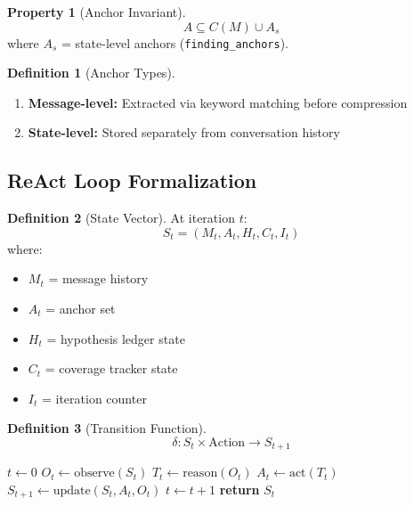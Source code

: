 \documentclass[11pt,a4paper]{article}
\theoremstyle{definition}
\newtheorem{definition}{Definition}[section]
\newtheorem{property}{Property}[section]
\newcommand{\code}[1]{\texttt{#1}}
\begin{document}
\begin{property}[Anchor Invariant]
\begin{equation}
A \subseteq C(M) \cup A_s
\end{equation}
where $A_s$ = state-level anchors (\code{finding\_anchors}).
\end{property}

\begin{definition}[Anchor Types]
\begin{enumerate}[label=(\alph*)]
    \item \textbf{Message-level:} Extracted via keyword matching before compression
    \item \textbf{State-level:} Stored separately from conversation history
\end{enumerate}
\end{definition}

\subsection{ReAct Loop Formalization}

\begin{definition}[State Vector]
At iteration $t$:
\begin{equation}
S_t = (M_t, A_t, H_t, C_t, I_t)
\end{equation}
where:
\begin{itemize}[leftmargin=*]
    \item $M_t$ = message history
    \item $A_t$ = anchor set
    \item $H_t$ = hypothesis ledger state
    \item $C_t$ = coverage tracker state
    \item $I_t$ = iteration counter
\end{itemize}
\end{definition}

\begin{definition}[Transition Function]
\begin{equation}
\delta : S_t \times \text{Action} \rightarrow S_{t+1}
\end{equation}
\end{definition}

\begin{algorithm}[H]
\caption{Bounded ReAct Loop}
\label{alg:react}
\begin{algorithmic}[1]
\STATE $t \leftarrow 0$
    \STATE $O_t \leftarrow \text{observe}(S_t)$
    \STATE $T_t \leftarrow \text{reason}(O_t)$
    \STATE $A_t \leftarrow \text{act}(T_t)$
    \STATE $S_{t+1} \leftarrow \text{update}(S_t, A_t, O_t)$
    \STATE $t \leftarrow t + 1$
\ENDWHILE
\STATE \textbf{return} $S_t$
\end{algorithmic}
\end{algorithm}
\end{document}
